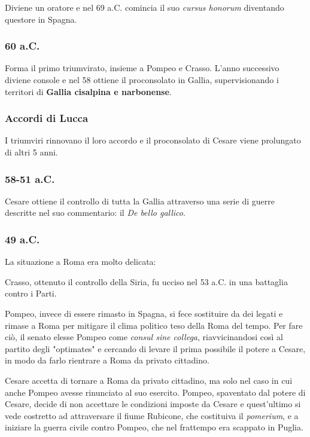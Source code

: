 \documentclass[10pt,a4paper]{article}
\begin{document}
	Diviene un oratore e nel 69 a.C. comincia il suo \textit{cursus honorum} diventando questore in Spagna.

	\subsubsection{60 a.C.}

	Forma il primo triumvirato, insieme a Pompeo e Crasso. L'anno successivo diviene console e nel 58 ottiene il proconsolato in Gallia, supervisionando i territori di \textbf{
	Gallia cisalpina e narbonense}.

	\subsubsection{Accordi di Lucca}

	I triumviri rinnovano il loro accordo e il proconsolato di Cesare viene prolungato di altri 5 anni.

	\subsubsection{58-51 a.C.}

	Cesare ottiene il controllo di tutta la Gallia attraverso una serie di guerre descritte nel suo commentario: il \textit{De bello gallico}.

	\subsubsection{49 a.C.}

	La situazione a Roma era molto delicata:

	Crasso, ottenuto il controllo della Siria, fu ucciso nel 53 a.C. in una battaglia contro i Parti.

	Pompeo, invece di essere rimasto in Spagna, si fece sostituire da dei legati e rimase a Roma per mitigare il clima politico teso della Roma del tempo. Per fare ciò, il senato elesse Pompeo come \textit{consul sine collega}, riavvicinandosi così al partito degli "optimates" e cercando di levare il prima possibile il potere a Cesare, in modo da farlo rientrare a Roma da privato cittadino.

	Cesare accetta di tornare a Roma da privato cittadino, ma solo nel caso in cui anche Pompeo avesse rinunciato al suo esercito. Pompeo, spaventato dal potere di Cesare, decide di non accettare le condizioni imposte da Cesare e quest'ultimo si vede costretto ad attraversare il fiume Rubicone, che costituiva il \textit{pomerium}, e a iniziare la guerra civile contro Pompeo, che nel frattempo era scappato in Puglia.
\end{document}
